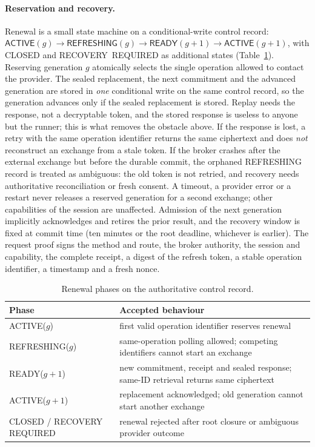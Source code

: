 \documentclass[11pt]{article}
\begin{document}
\paragraph{Reservation and recovery.} Renewal is a small state machine on a conditional-write control record: $\textsf{ACTIVE}(g)\rightarrow\textsf{REFRESHING}(g)\rightarrow\textsf{READY}(g{+}1)\rightarrow\textsf{ACTIVE}(g{+}1)$, with CLOSED and RECOVERY~REQUIRED as additional states (Table~\ref{tab:states}). Reserving generation $g$ atomically selects the single operation allowed to contact the provider. The sealed replacement, the next commitment and the advanced generation are stored in \emph{one} conditional write on the same control record, so the generation advances only if the sealed replacement is stored. Replay needs the response, not a decryptable token, and the stored response is useless to anyone but the runner; this is what removes the obstacle above. If the response is lost, a retry with the same operation identifier returns the same ciphertext and does \emph{not} reconstruct an exchange from a stale token. If the broker crashes after the external exchange but before the durable commit, the orphaned REFRESHING record is treated as ambiguous: the old token is not retried, and recovery needs authoritative reconciliation or fresh consent. A timeout, a provider error or a restart never releases a reserved generation for a second exchange; other capabilities of the session are unaffected. Admission of the next generation implicitly acknowledges and retires the prior result, and the recovery window is fixed at commit time (ten minutes or the root deadline, whichever is earlier). The request proof signs the method and route, the broker authority, the session and capability, the complete receipt, a digest of the refresh token, a stable operation identifier, a timestamp and a fresh nonce.

\begin{table}[t]
\centering
\small
\begin{tabular}{@{}p{}p{}@{}}
\toprule
Phase & Accepted behaviour \\
\midrule
\textsf{ACTIVE}($g$) & first valid operation identifier reserves renewal \\
\textsf{REFRESHING}($g$) & same-operation polling allowed; competing identifiers cannot start an exchange \\
\textsf{READY}($g{+}1$) & new commitment, receipt and sealed response; same-ID retrieval returns same ciphertext \\
\textsf{ACTIVE}($g{+}1$) & replacement acknowledged; old generation cannot start another exchange \\
CLOSED / RECOVERY REQUIRED & renewal rejected after root closure or ambiguous provider outcome \\
\bottomrule
\end{tabular}
\caption{Renewal phases on the authoritative control record.}
\label{tab:states}
\end{table}
\end{document}
